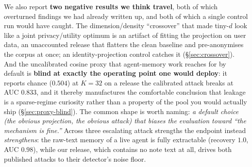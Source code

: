 \documentclass[pdflatex,sn-mathphys-num,iicol]{sn-jnl}
\theoremstyle{thmstyleone}%
\theoremstyle{thmstyletwo}%
\theoremstyle{thmstylethree}%
\newcommand{\secref}[1]{\S\ref{#1}}
\begin{document}
We also report \textbf{two negative results we think travel}, both of which overturned findings we had
already written up, and both of which a single control run would have caught. The dimension/density
``crossover'' that made tiny-$d$ look like a joint privacy/utility optimum is an artifact of fitting
the projection on user data, an unaccounted release that flatters the clean baseline and
pre-anonymises the corpus at once; an identity-projection control catches it
(\secref{sec:crossover}). And the uncalibrated cosine proxy that agent-memory work reaches for by
default is \textbf{blind at exactly the operating point one would deploy}: it reports chance
($0.504$) at $K = 32$ on a release the calibrated attack breaks at AUC $0.833$, and it thereby
manufactures the comfortable conclusion that leakage is a sparse-regime curiosity rather than a
property of the pool you would actually ship (\secref{sec:proxy-blind}). The common shape is worth
naming: \emph{a default choice (the obvious projection, the obvious attack) that biases the
evaluation toward ``the mechanism is fine.''} Across three escalating attack strengths the endpoint
instead \emph{strengthens}: the raw-text memory of a live agent is fully extractable (recovery $1.0$,
AUC $0.98$), while our release, which contains no note text at all, drives both published attacks to
their detector's noise floor.
\end{document}
